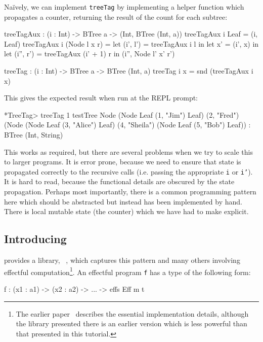 Na\"{i}vely, we can implement \texttt{treeTag} by implementing a helper
function which propagates a counter, returning the result of the count for
each subtree:

\begin{code}
treeTagAux : (i : Int) -> BTree a -> (Int, BTree (Int, a))
treeTagAux i Leaf = (i, Leaf)
treeTagAux i (Node l x r)
       = let (i', l') = treeTagAux i l in
         let x' = (i', x) in
         let (i'', r') = treeTagAux (i' + 1) r in
             (i'', Node l' x' r')
  
treeTag : (i : Int) -> BTree a -> BTree (Int, a)
treeTag i x = snd (treeTagAux i x)
\end{code}

\noindent
This gives the expected result when run at the \Idris{} REPL prompt:

\begin{code}
*TreeTag> treeTag 1 testTree 
Node (Node Leaf (1, "Jim") Leaf)
     (2, "Fred")
     (Node (Node Leaf (3, "Alice") Leaf)
           (4, "Sheila")
           (Node Leaf (5, "Bob") Leaf)) : BTree (Int, String)
\end{code}

\noindent
This works as required, but there are several problems when we try to scale
this to larger programs. It is error prone, because we need to ensure that
state is propagated correctly to the recursive calls (i.e. passing the
appropriate \texttt{i} or \texttt{i'}). It is hard to read, because the
functional details are obscured by the state propagation. Perhaps most
importantly, there is a common programming pattern here which should be
abstracted but instead has been implemented by hand. There is local mutable
state (the counter) which we have had to make explicit.

\subsection{Introducing \effects{}}

\Idris{} provides a library, \effects{}~\cite{brady-icfp2013}, which captures
this pattern and many others involving effectful computation\footnote{The
earlier paper~\cite{brady-icfp2013} describes the essential implementation
details, although the library presented there is an earlier version which is
less powerful than that presented in this tutorial.}. An effectful program
\texttt{f} has a type of the following form:

\begin{code}
f : (x1 : a1) -> (x2 : a2) -> ... -> { effs } Eff m t
\end{code}

